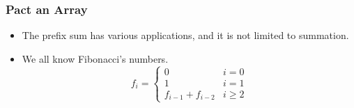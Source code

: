 \documentclass{beamer}
\begin{document}
\begin{CJK}{UTF8}{bsmi}
\begin{frame}
\frametitle{Pact an Array}
\centerline{}
\end{frame}

\begin{frame}
\begin{itemize}
\frametitle{Fibonacci's Numbers}
\item The prefix sum has various applications, and it is not limited
  to summation.
\item We all know Fibonacci's numbers. 
\begin{equation}   
f_i = \left\{
\begin{array}{ll}
0 &  i = 0 \\  
1 &  i = 1 \\  
f_{i - 1} + f_{i - 2} &  i \geq 2
\end{array}
\right.
\end{equation}
\end{itemize}
\end{frame}



\end{CJK}
\end{document}
